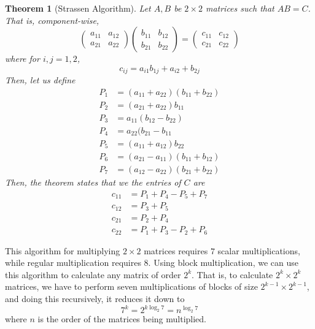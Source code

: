 \documentclass{article}
\newtheorem{theorem}{Theorem}[section]
\theoremstyle{remark}
\theoremstyle{definition}
\begin{document}
    \begin{theorem}[Strassen Algorithm]
    Let $A, B$ be $2 \times 2$ matrices such that $AB = C$. That is, component-wise,
    \[\begin{pmatrix}
    a_{11} & a_{12} \\ a_{21} & a_{22}
    \end{pmatrix} \begin{pmatrix}
    b_{11} & b_{12} \\ b_{21} & b_{22}
    \end{pmatrix}
     = \begin{pmatrix}
      c_{11} & c_{12} \\ c_{21} & c_{22}
     \end{pmatrix}\]
    where for $i, j = 1, 2$, 
    \[c_{ij} = a_{i1} b_{1j} + a_{i2} + b_{2j}\]
    Then, let us define 
    \begin{align*}
        P_1 &= (a_{11} + a_{22}) (b_{11} + b_{22}) \\
        P_2 &= (a_{21} + a_{22}) b_{11} \\
        P_3 &= a_{11} (b_{12} - b_{22}) \\
        P_4 &= a_{22} (b_{21} - b_{11} \\
        P_5 &= (a_{11} + a_{12}) b_{22} \\
        P_6 &= (a_{21} - a_{11}) (b_{11} + b_{12}) \\
        P_7 &= (a_{12} - a_{22}) (b_{21} + b_{22}) 
    \end{align*}
    Then, the theorem states that we the entries of $C$ are 
    \begin{align*}
        c_{11} &= P_1 + P_4 - P_5 + P_7 \\
        c_{12} &= P_3 + P_5 \\
        c_{21} &= P_2 + P_4 \\
        c_{22} &= P_1 + P_3 - P_2 + P_6
    \end{align*}
    \end{theorem}

    This algorithm for multiplying $2\times 2$ matrices requires $7$ scalar multiplications, while regular multiplication requires $8$. Using block multiplication, we can use this algorithm to calculate any matrix of order $2^k$. That is, to calculate $2^k \times 2^k$ matrices, we have to perform seven multiplications of blocks of size $2^{k-1} \times 2^{k-1}$, and doing this recursively, it reduces it down to 
    \[7^k = 2^{k \log_2{7}} = n^{\log_2{7}}\]
    where $n$ is the order of the matrices being multiplied. 
\end{document}
